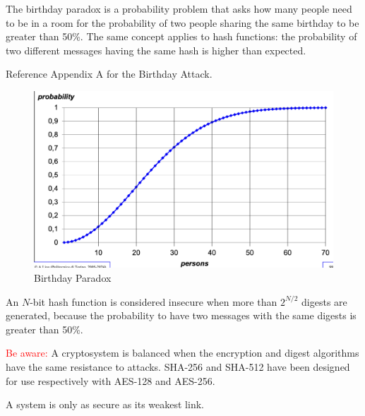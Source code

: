 \begin{multicols}{2}
    The birthday paradox is a probability problem that asks how many people need to be in a room for the probability of two people sharing the same birthday to be greater than 50\%. The same concept applies to hash functions: the probability of two different messages having the same hash is higher than expected.

    \vspace{0.5cm}

    \begin{center}
        Reference Appendix A for the Birthday Attack.
    \end{center}

\columnbreak

    \begin{figure}[H]
        \centering
        \includegraphics[width=\linewidth]{Images/Cryptography/bd_paradox.png}
        \caption{Birthday Paradox}
    \end{figure}
\end{multicols}


\begin{tcolorbox}[colback=blue!10!white, colframe=blue!50!white, title=Insecure Hash Functions]
    An $N$-bit hash function is considered insecure when more than $2^{N/2}$ digests are generated, because the probability to have two messages with the same digests is greater than 50\%. 
\end{tcolorbox}

\textcolor{red}{Be aware:} A cryptosystem is balanced when the encryption and digest algorithms have the same resistance to attacks. SHA-256 and SHA-512 have been designed for use respectively with AES-128 and AES-256.

\begin{tcolorbox}[colback=red!10!white, colframe=red!70!black, coltitle=white, title=Beware]
    A system is only as secure as its weakest link.
\end{tcolorbox}


